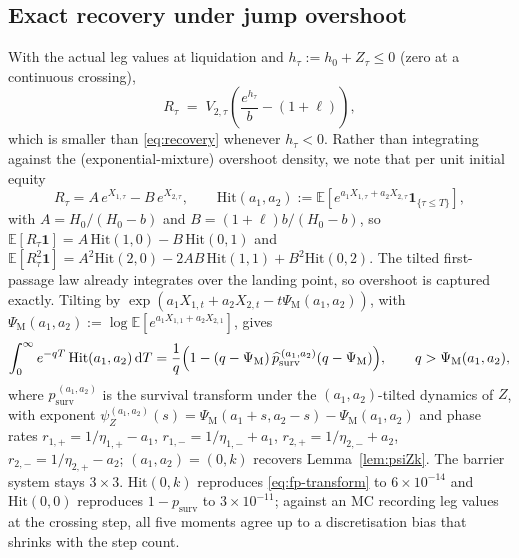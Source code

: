 \documentclass[11pt]{article}
\newcommand{\E}{\mathbb{E}}
\newcommand{\diff}{\mathrm{d}}
\newcommand{\one}{\mathbf{1}}
\theoremstyle{plain}
\theoremstyle{definition}
\theoremstyle{remark}
\begin{document}
\subsection{Exact recovery under jump overshoot}\label{sec:overshoot}
With the actual leg values at liquidation and $h_\tau:=h_0+Z_\tau\le0$ (zero at a continuous
crossing),
\begin{equation}\label{eq:recovery-exact}
R_\tau \;=\; V_{2,\tau}\!\left(\frac{e^{h_\tau}}{b}-(1+\ell)\right),
\end{equation}
which is smaller than \eqref{eq:recovery} whenever $h_\tau<0$. Rather than integrating against the
(exponential-mixture) overshoot density, we note that per unit initial equity
\begin{equation}\label{eq:joint-hit}
R_\tau=A\,e^{X_{1,\tau}}-B\,e^{X_{2,\tau}},
\qquad
\mathrm{Hit}(a_1,a_2):=\E\!\left[e^{a_1X_{1,\tau}+a_2X_{2,\tau}}\one_{\{\tau\le T\}}\right],
\end{equation}
with $A=H_0/(H_0-b)$ and $B=(1+\ell)b/(H_0-b)$, so $\E[R_\tau\one]=A\,\mathrm{Hit}(1,0)-B\,\mathrm{Hit}(0,1)$
and $\E[R_\tau^2\one]=A^2\mathrm{Hit}(2,0)-2AB\,\mathrm{Hit}(1,1)+B^2\mathrm{Hit}(0,2)$. The tilted
first-passage law already integrates over the landing point, so overshoot is captured exactly.
Tilting by $\exp(a_1X_{1,t}+a_2X_{2,t}-t\Psi_{\mathrm{M}}(a_1,a_2))$, with
$\Psi_{\mathrm{M}}(a_1,a_2):=\log\E[e^{a_1X_{1,1}+a_2X_{2,1}}]$, gives
\begin{equation}\label{eq:joint-hit-transform}
\int_0^\infty e^{-qT}\,\mathrm{Hit}(a_1,a_2)\,\diff T
=\frac1q\Bigl(1-(q-\Psi_{\mathrm{M}})\,\widehat p^{\,(a_1,a_2)}_{\mathrm{surv}}(q-\Psi_{\mathrm{M}})\Bigr),
\qquad q>\Psi_{\mathrm{M}}(a_1,a_2),
\end{equation}
where $\widehat p^{\,(a_1,a_2)}_{\mathrm{surv}}$ is the survival transform under the
$(a_1,a_2)$-tilted dynamics of $Z$, with exponent
$\psi_Z^{(a_1,a_2)}(s)=\Psi_{\mathrm{M}}(a_1+s,a_2-s)-\Psi_{\mathrm{M}}(a_1,a_2)$ and phase rates
$r_{1,+}=1/\eta_{1,+}-a_1$, $r_{1,-}=1/\eta_{1,-}+a_1$, $r_{2,+}=1/\eta_{2,-}+a_2$,
$r_{2,-}=1/\eta_{2,+}-a_2$; $(a_1,a_2)=(0,k)$ recovers Lemma~\ref{lem:psiZk}. The barrier system
stays $3\times3$. $\mathrm{Hit}(0,k)$ reproduces \eqref{eq:fp-transform} to $6\times10^{-14}$ and
$\mathrm{Hit}(0,0)$ reproduces $1-p_{\mathrm{surv}}$ to $3\times10^{-11}$; against an MC recording
leg values at the crossing step, all five moments agree up to a discretisation bias that shrinks with
the step count.
\end{document}
